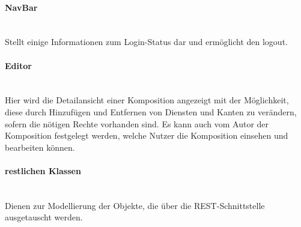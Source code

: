 \paragraph{NavBar}\mbox{}\\
Stellt einige Informationen zum Login-Status dar und ermöglicht den logout.
\paragraph{Editor}\mbox{}\\
Hier wird die Detailansicht einer Komposition angezeigt mit der Möglichkeit, diese durch Hinzufügen und Entfernen von
Diensten und Kanten zu verändern, sofern die nötigen Rechte vorhanden sind. Es kann auch vom Autor der Komposition festgelegt
werden, welche Nutzer die Komposition einsehen und bearbeiten können. 
\paragraph{restlichen Klassen}\mbox{}\\
Dienen zur Modellierung der Objekte, die über die REST-Schnittstelle ausgetauscht werden. 
